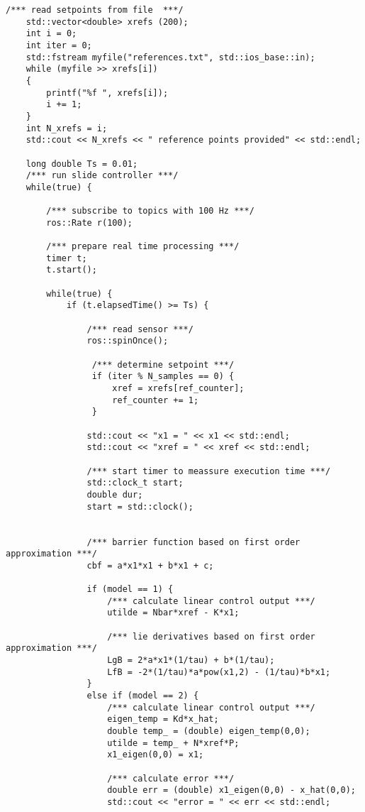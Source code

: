 \begin{lstlisting}[language=gedit]
    /*** read setpoints from file  ***/
    std::vector<double> xrefs (200);
    int i = 0;
    int iter = 0;
    std::fstream myfile("references.txt", std::ios_base::in);
    while (myfile >> xrefs[i])
    {
        printf("%f ", xrefs[i]);
        i += 1; 
    }
    int N_xrefs = i;
    std::cout << N_xrefs << " reference points provided" << std::endl;

    long double Ts = 0.01;
    /*** run slide controller ***/
    while(true) {

        /*** subscribe to topics with 100 Hz ***/
        ros::Rate r(100);

        /*** prepare real time processing ***/
        timer t;
        t.start();

        while(true) {
            if (t.elapsedTime() >= Ts) {
              
                /*** read sensor ***/ 
                ros::spinOnce();
 
                 /*** determine setpoint ***/
                 if (iter % N_samples == 0) {
                     xref = xrefs[ref_counter];
                     ref_counter += 1; 
                 }
          
                std::cout << "x1 = " << x1 << std::endl;
                std::cout << "xref = " << xref << std::endl;
 
                /*** start timer to meassure execution time ***/
                std::clock_t start;
                double dur;
                start = std::clock();               
               

                /*** barrier function based on first order approximation ***/
                cbf = a*x1*x1 + b*x1 + c;

                if (model == 1) {
                    /*** calculate linear control output ***/
                    utilde = Nbar*xref - K*x1;

                    /*** lie derivatives based on first order approximation ***/
                    LgB = 2*a*x1*(1/tau) + b*(1/tau);
                    LfB = -2*(1/tau)*a*pow(x1,2) - (1/tau)*b*x1;
                }
                else if (model == 2) {
                    /*** calculate linear control output ***/
                    eigen_temp = Kd*x_hat;
                    double temp_ = (double) eigen_temp(0,0);
                    utilde = temp_ + N*xref*P;
                    x1_eigen(0,0) = x1;

                    /*** calculate error ***/
                    double err = (double) x1_eigen(0,0) - x_hat(0,0);
                    std::cout << "error = " << err << std::endl;


\end{lstlisting}
